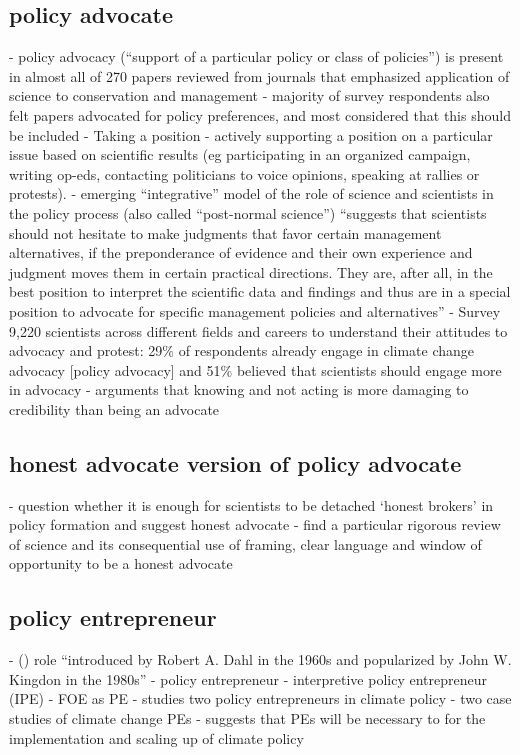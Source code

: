 \subsection{policy advocate}
\cite{ScottRLPAFSRSS2007} - policy advocacy (``support of a particular policy or class of policies'') is present in almost all of 270 papers reviewed from journals that emphasized application of science to conservation and management - majority of survey respondents also felt papers advocated for policy preferences, and most considered that this should be included
\cite{SteelLLS2004,SinghTKMMC2014} - Taking a position - actively supporting a position on a particular issue based on scientific results (eg participating in an organized campaign, writing op-eds, contacting politicians to voice opinions, speaking at rallies or protests).
\cite{SteelLLS2004} - emerging ``integrative'' model of the role of science and scientists in the policy process (also called ``post-normal science'') ``suggests that scientists should not hesitate to make judgments that favor certain management alternatives, if the preponderance of evidence and their own experience and judgment moves them in certain practical directions. They are, after all, in the best position to interpret the scientific data and findings and thus are in a special position to advocate for specific management policies and alternatives''
\cite{DablanderSCSBGGBAH2024} - Survey 9,220 scientists across different fields and careers to understand their attitudes to advocacy and protest: 29\% of respondents already engage in climate change advocacy [policy advocacy] and 51\% believed that scientists should engage more in advocacy
\cite{WyattGT2024} - arguments that knowing and not acting is more damaging to credibility than being an advocate

\subsection{honest advocate version of policy advocate}
\cite{GregoryBW2024} - question whether it is enough for scientists to be detached `honest brokers' in policy formation and suggest honest advocate
\cite{RoseBOP2018} - find a particular rigorous review of science and its consequential use of framing, clear language and window of opportunity to be a honest advocate

\subsection{policy entrepreneur}
\cite{vonMalmborg2024strategies} -  (\PE) role ``introduced by Robert A. Dahl in the 1960s and popularized by John W. Kingdon in the 1980s''
\cite{Cairney2018} - policy entrepreneur
\cite{AukesLB2018} - interpretive policy entrepreneur (IPE)
\cite{CarterC2018} - FOE as PE
\cite{MintromL2017} - studies two policy entrepreneurs in climate policy
\cite{MintromL2017} - two case studies of climate change PEs
\cite{Green2017} - suggests that PEs will be necessary to for the implementation and scaling up of climate policy

